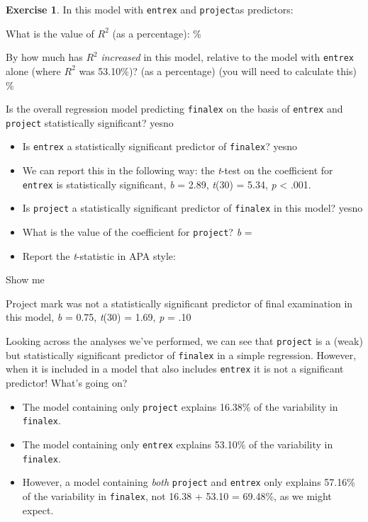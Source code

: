 \documentclass[
]{book}
\theoremstyle{definition}
\theoremstyle{definition}
\theoremstyle{definition}
\newtheorem{exercise}{Exercise}[chapter]
\theoremstyle{definition}
\theoremstyle{remark}
\begin{document}
\begin{exercise}

In this model with \texttt{entrex} and \texttt{project}as predictors:

What is the value of \(R^2\) (as a percentage): \%

By how much has \(R^2\) \emph{increased} in this model, relative to the model with \texttt{entrex} alone (where \(R^2\) was 53.10\%)? (as a percentage) (you will need to calculate this) \%

Is the overall regression model predicting \texttt{finalex} on the basis of \texttt{entrex} and \texttt{project} statistically significant? yesno

\begin{itemize}
\item
  Is \texttt{entrex} a statistically significant predictor of \texttt{finalex}? yesno
\item
  We can report this in the following way: the \emph{t}-test on the coefficient for \texttt{entrex} is statistically significant, \emph{b} = 2.89, \emph{t}(30) = 5.34, \emph{p} \textless{} .001.
\item
  Is \texttt{project} a statistically significant predictor of \texttt{finalex} in this model? yesno
\item
  What is the value of the coefficient for \texttt{project}? \emph{b} =
\item
  Report the \emph{t}-statistic in APA style:
\end{itemize}

Show me

Project mark was not a statistically significant predictor of final examination in this model, \emph{b} = 0.75, \emph{t}(30) = 1.69, \emph{p} = .10

\end{exercise}

Looking across the analyses we've performed, we can see that \texttt{project} is a (weak) but statistically significant predictor of \texttt{finalex} in a simple regression. However, when it is included in a model that also includes \texttt{entrex} it is not a significant predictor! What's going on?

\begin{itemize}
\item
  The model containing only \texttt{project} explains 16.38\% of the variability in \texttt{finalex}.
\item
  The model containing only \texttt{entrex} explains 53.10\% of the variability in \texttt{finalex}.
\item
  However, a model containing \emph{both} \texttt{project} and \texttt{entrex} only explains 57.16\% of the variability in \texttt{finalex}, not 16.38 + 53.10 = 69.48\%, as we might expect.
\end{itemize}
\end{document}
